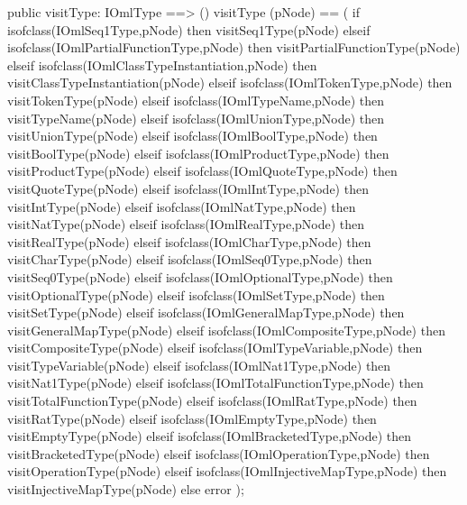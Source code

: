 \begin{vdm_al}
  public visitType: IOmlType ==> ()
  visitType (pNode) ==
    ( if isofclass(IOmlSeq1Type,pNode) then visitSeq1Type(pNode)
      elseif isofclass(IOmlPartialFunctionType,pNode) then visitPartialFunctionType(pNode)
      elseif isofclass(IOmlClassTypeInstantiation,pNode) then visitClassTypeInstantiation(pNode)
      elseif isofclass(IOmlTokenType,pNode) then visitTokenType(pNode)
      elseif isofclass(IOmlTypeName,pNode) then visitTypeName(pNode)
      elseif isofclass(IOmlUnionType,pNode) then visitUnionType(pNode)
      elseif isofclass(IOmlBoolType,pNode) then visitBoolType(pNode)
      elseif isofclass(IOmlProductType,pNode) then visitProductType(pNode)
      elseif isofclass(IOmlQuoteType,pNode) then visitQuoteType(pNode)
      elseif isofclass(IOmlIntType,pNode) then visitIntType(pNode)
      elseif isofclass(IOmlNatType,pNode) then visitNatType(pNode)
      elseif isofclass(IOmlRealType,pNode) then visitRealType(pNode)
      elseif isofclass(IOmlCharType,pNode) then visitCharType(pNode)
      elseif isofclass(IOmlSeq0Type,pNode) then visitSeq0Type(pNode)
      elseif isofclass(IOmlOptionalType,pNode) then visitOptionalType(pNode)
      elseif isofclass(IOmlSetType,pNode) then visitSetType(pNode)
      elseif isofclass(IOmlGeneralMapType,pNode) then visitGeneralMapType(pNode)
      elseif isofclass(IOmlCompositeType,pNode) then visitCompositeType(pNode)
      elseif isofclass(IOmlTypeVariable,pNode) then visitTypeVariable(pNode)
      elseif isofclass(IOmlNat1Type,pNode) then visitNat1Type(pNode)
      elseif isofclass(IOmlTotalFunctionType,pNode) then visitTotalFunctionType(pNode)
      elseif isofclass(IOmlRatType,pNode) then visitRatType(pNode)
      elseif isofclass(IOmlEmptyType,pNode) then visitEmptyType(pNode)
      elseif isofclass(IOmlBracketedType,pNode) then visitBracketedType(pNode)
      elseif isofclass(IOmlOperationType,pNode) then visitOperationType(pNode)
      elseif isofclass(IOmlInjectiveMapType,pNode) then visitInjectiveMapType(pNode)
      else error );


\end{vdm_al}

